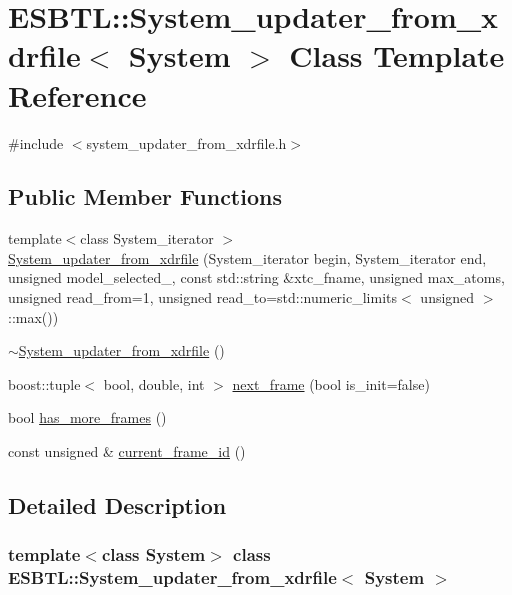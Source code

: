 \hypertarget{classESBTL_1_1System__updater__from__xdrfile}{}\section{E\+S\+B\+TL\+:\+:System\+\_\+updater\+\_\+from\+\_\+xdrfile$<$ System $>$ Class Template Reference}
\label{classESBTL_1_1System__updater__from__xdrfile}


{\ttfamily \#include $<$system\+\_\+updater\+\_\+from\+\_\+xdrfile.\+h$>$}

\subsection*{Public Member Functions}
\begin{DoxyCompactItemize}
\item 
{\footnotesize template$<$class System\+\_\+iterator $>$ }\\\hyperlink{classESBTL_1_1System__updater__from__xdrfile_ab8ec6b14664c00a39bc8878c54514307}{System\+\_\+updater\+\_\+from\+\_\+xdrfile} (System\+\_\+iterator begin, System\+\_\+iterator end, unsigned model\+\_\+selected\+\_\+, const std\+::string \&xtc\+\_\+fname, unsigned max\+\_\+atoms, unsigned read\+\_\+from=1, unsigned read\+\_\+to=std\+::numeric\+\_\+limits$<$ unsigned $>$\+::max())
\item 
\hyperlink{classESBTL_1_1System__updater__from__xdrfile_a2023589e3370c4826ece05e8c197ae70}{$\sim$\+System\+\_\+updater\+\_\+from\+\_\+xdrfile} ()
\item 
boost\+::tuple$<$ bool, double, int $>$ \hyperlink{classESBTL_1_1System__updater__from__xdrfile_a295ff6221508724b6a7a6d2c95990195}{next\+\_\+frame} (bool is\+\_\+init=false)
\item 
bool \hyperlink{classESBTL_1_1System__updater__from__xdrfile_a9c7da450c1690fa709304039fe47f57b}{has\+\_\+more\+\_\+frames} ()
\item 
const unsigned \& \hyperlink{classESBTL_1_1System__updater__from__xdrfile_ab3c93e0cd396173a06668501f63f54a8}{current\+\_\+frame\+\_\+id} ()
\end{DoxyCompactItemize}


\subsection{Detailed Description}
\subsubsection*{template$<$class System$>$\newline
class E\+S\+B\+T\+L\+::\+System\+\_\+updater\+\_\+from\+\_\+xdrfile$<$ System $>$}

